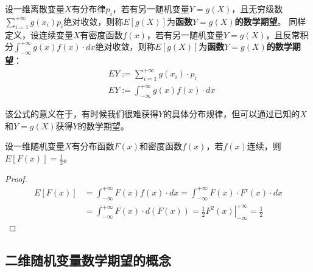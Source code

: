 \begin{definition}[一维随机变量函数的数学期望]
设一维离散变量$X$有分布律$p_i$，若有另一随机变量$Y=g\left( X \right) $，且无穷级数$\sum_{i=1}^{+\infty}{g\left( x_i \right) p_i}$绝对收敛，则称$E\left[ g\left( X \right) \right] $为{\bf 函数$Y=g\left( X \right) $的数学期望}。
同样定义，设连续变量$X$有密度函数$f\left( x \right) $，若有另一随机变量$Y=g\left( X \right) $，且反常积分$\int_{-\infty}^{+\infty}{g\left( x \right) f\left( x \right) \cdot dx}$绝对收敛，则称$E\left[ g\left( X \right) \right] $为{\bf 函数$Y=g\left( X \right) $的数学期望}：
\begin{align*}
&EY:=\sum_{i=1}^{+\infty}{g\left( x_i \right) \cdot p_i} \\
&EY:=\int_{-\infty}^{+\infty}{g\left( x \right) f\left( x \right) \cdot dx}
\end{align*}
\end{definition}

该公式的意义在于，有时候我们很难获得$Y$的具体分布规律，但可以通过已知的$X$和$Y=g\left( X \right) $获得$Y$的数学期望。

\begin{theorem}
设一维随机变量$X$有分布函数$F\left( x \right) $和密度函数$f\left( x \right) $，若$f\left( x \right) $连续，则$E\left[ F\left( x \right) \right] =\frac{1}{2}$。
\end{theorem}

\begin{proof}
\begin{align*}
    E\left[ F\left( x \right) \right] &=\int_{-\infty}^{+\infty}{F\left( x \right) f\left( x \right) \cdot dx}=\int_{-\infty}^{+\infty}{F\left( x \right) \cdot F'\left( x \right) \cdot dx}\\
    &=\int_{-\infty}^{+\infty}{F\left( x \right) \cdot d\left( F\left( x \right) \right)}=\left. \frac{1}{2}F^2\left( x \right) \right|_{-\infty}^{+\infty}=\frac{1}{2}
\end{align*}
\end{proof}

\subsection{二维随机变量数学期望的概念}

